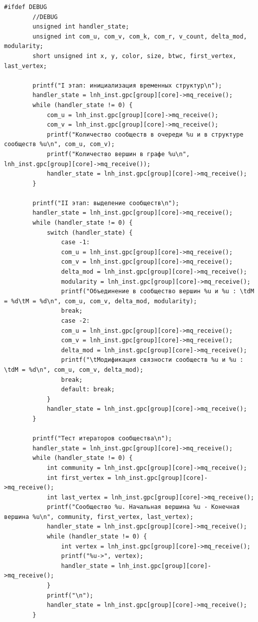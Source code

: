 \begin{lstlisting}[label=lst:host,caption=Измененный код хост-системы под индивидульное задание]
		#ifdef DEBUG
		//DEBUG
		unsigned int handler_state;
		unsigned int com_u, com_v, com_k, com_r, v_count, delta_mod, modularity;
		short unsigned int x, y, color, size, btwc, first_vertex, last_vertex;
		
		printf("I этап: инициализация временных структур\n");
		handler_state = lnh_inst.gpc[group][core]->mq_receive();
		while (handler_state != 0) {
			com_u = lnh_inst.gpc[group][core]->mq_receive();
			com_v = lnh_inst.gpc[group][core]->mq_receive();
			printf("Количество сообществ в очереди %u и в структуре сообществ %u\n", com_u, com_v);
			printf("Количество вершин в графе %u\n", lnh_inst.gpc[group][core]->mq_receive());
			handler_state = lnh_inst.gpc[group][core]->mq_receive();
		}
		
		printf("II этап: выделение сообществ\n");
		handler_state = lnh_inst.gpc[group][core]->mq_receive();
		while (handler_state != 0) {
			switch (handler_state) {
				case -1:
				com_u = lnh_inst.gpc[group][core]->mq_receive();
				com_v = lnh_inst.gpc[group][core]->mq_receive();
				delta_mod = lnh_inst.gpc[group][core]->mq_receive();
				modularity = lnh_inst.gpc[group][core]->mq_receive();
				printf("Объединение в сообщество вершин %u и %u : \tdM = %d\tM = %d\n", com_u, com_v, delta_mod, modularity);
				break;
				case -2:
				com_u = lnh_inst.gpc[group][core]->mq_receive();
				com_v = lnh_inst.gpc[group][core]->mq_receive();
				delta_mod = lnh_inst.gpc[group][core]->mq_receive();
				printf("\tМодификация связности сообществ %u и %u : \tdM = %d\n", com_u, com_v, delta_mod);
				break;
				default: break;
			}
			handler_state = lnh_inst.gpc[group][core]->mq_receive();
		}
		
		printf("Тест итераторов сообщества\n");
		handler_state = lnh_inst.gpc[group][core]->mq_receive();
		while (handler_state != 0) {
			int community = lnh_inst.gpc[group][core]->mq_receive();
			int first_vertex = lnh_inst.gpc[group][core]->mq_receive();
			int last_vertex = lnh_inst.gpc[group][core]->mq_receive();
			printf("Сообщество %u. Начальная вершина %u - Конечная вершина %u\n", community, first_vertex, last_vertex);
			handler_state = lnh_inst.gpc[group][core]->mq_receive();
			while (handler_state != 0) {
				int vertex = lnh_inst.gpc[group][core]->mq_receive();
				printf("%u->", vertex);
				handler_state = lnh_inst.gpc[group][core]->mq_receive();
			}
			printf("\n");
			handler_state = lnh_inst.gpc[group][core]->mq_receive();
		}
		

\end{lstlisting}

